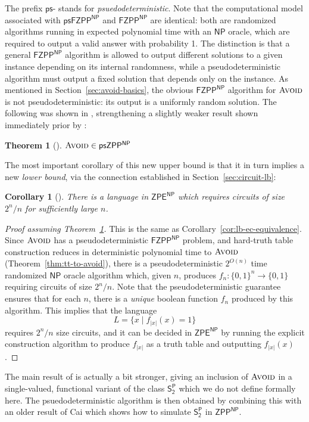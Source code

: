 \documentclass[11pt]{article}
\newtheorem{theorem}{Theorem}
\newtheorem{corollary}{Corollary}
\newcommand{\dash}{\text{-}}
\newcommand{\B}{\{0,1\}}
\newcommand{\avoid}{\textsc{Avoid}}
\begin{document}
The prefix $\mathsf{ps}\dash$ stands for \emph{psuedodeterministic}. Note that the computational model associated with $\mathsf{psFZPP^{NP}}$ and $\mathsf{FZPP^{NP}}$ are identical: both are randomized algorithms running in expected polynomial time with an $\mathsf{NP}$ oracle, which are required to output a valid answer with probability 1. The distinction is that a general $\mathsf{FZPP^{NP}}$ algorithm is allowed to output different solutions to a given instance depending on its internal randomness, while a pseudodeterministic algorithm must output a fixed solution that depends only on the instance. As mentioned in Section~\ref{sec:avoid-basics}, the obvious $\mathsf{FZPP^{NP}}$ algorithm for $\avoid$ is not pseudodeterministic: its output is a uniformly random solution. The following was shown in \cite{Li}, strengthening a slightly weaker result shown immediately prior by \cite{CHR}:
\begin{theorem}[\cite{Li,CHR}]\label{thm:pseudo-avoid}
$\avoid \in \mathsf{psZPP^{NP}}$
\end{theorem}

The most important corollary of this new upper bound is that it in turn implies a new \emph{lower bound}, via the connection established in Section~\ref{sec:circuit-lb}:
\begin{corollary}[\cite{Li,CHR}]
There is a language in $\mathsf{ZPE^{NP}}$ which requires circuits of size $2^n/n$ for sufficiently large $n$.
\end{corollary}
\begin{proof}[Proof assuming Theorem~\ref{thm:pseudo-avoid}]
This is the same as Corollary~\ref{cor:lb-ec-equivalence}. Since $\avoid$ has a pseudodeterministic $\mathsf{FZPP^{NP}}$ problem, and hard-truth table construction reduces in deterministic polynomial time to $\avoid$ (Theorem~\ref{thm:tt-to-avoid}), there is a pseudodeterministic $2^{O(n)}$ time randomized $\mathsf{NP}$ oracle algorithm which, given $n$, produces $f_n: \B^n \to \B$ requiring circuits of size $2^n/n$. Note that the pseudodeterministic guarantee ensures that for each $n$, there is a \emph{unique} boolean function $f_n$ produced by this algorithm. This implies that the language
\[
L = \{x \mid f_{|x|}(x)=1\}
\] 
requires $2^n/n$ size circuits, and it can be decided in $\mathsf{ZPE^{NP}}$ by running the explicit construction algorithm to produce $f_{|x|}$ as a truth table and outputting $f_{|x|}(x)$.
\end{proof}

The main result of \cite{Li,CHR} is actually a bit stronger, giving an inclusion of $\avoid$ in a single-valued, functional variant of the class $\mathsf{S_2^P}$ which we do not define formally here. The psuedodeterministic algorithm is then obtained by combining this with an older result of Cai \cite{cai} which shows how to simulate $\mathsf{S_2^P}$ in $\mathsf{ZPP^{NP}}$.
\end{document}
